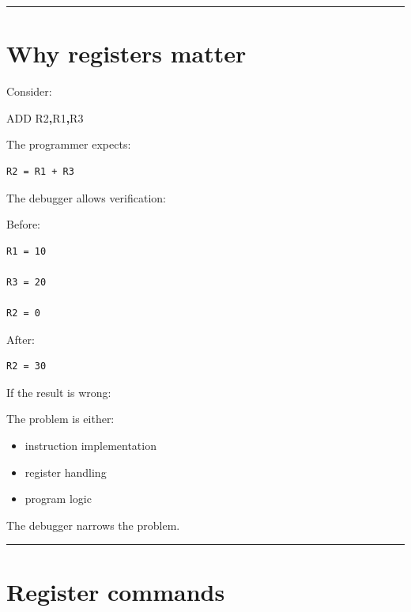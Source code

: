 \documentclass[
  oneside,
  openany]{book}
\newenvironment{Shaded}{\begin{snugshade}}{\end{snugshade}}
\newcommand{\BuiltInTok}[1]{#1}
\newcommand{\NormalTok}[1]{#1}
\newcommand{\OperatorTok}[1]{\textcolor[rgb]{0.81,0.36,0.00}{\textbf{#1}}}
\providecommand{\tightlist}{%
  \setlength{\itemsep}{0pt}\setlength{\parskip}{0pt}}
\begin{document}
\begin{center}\rule{0.5\linewidth}{0.5pt}\end{center}

\hypertarget{why-registers-matter}{%
\section{Why registers matter}\label{why-registers-matter}}

Consider:

\begin{Shaded}
\begin{Highlighting}[]
\BuiltInTok{ADD}\NormalTok{ R2}\OperatorTok{,}\NormalTok{R1}\OperatorTok{,}\NormalTok{R3}
\end{Highlighting}
\end{Shaded}

The programmer expects:

\begin{verbatim}
R2 = R1 + R3
\end{verbatim}

The debugger allows verification:

Before:

\begin{verbatim}
R1 = 10

R3 = 20

R2 = 0
\end{verbatim}

After:

\begin{verbatim}
R2 = 30
\end{verbatim}

If the result is wrong:

The problem is either:

\begin{itemize}
\tightlist
\item
  instruction implementation
\item
  register handling
\item
  program logic
\end{itemize}

The debugger narrows the problem.

\begin{center}\rule{0.5\linewidth}{0.5pt}\end{center}

\hypertarget{register-commands}{%
\section{Register commands}\label{register-commands}}
\end{document}
